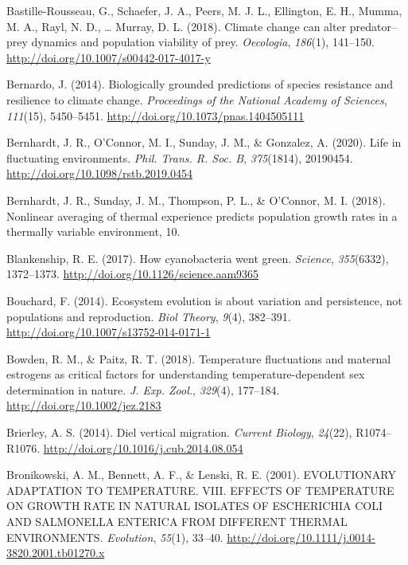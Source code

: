 \documentclass[12pt,twoside]{reedthesis}
\begin{document}
\leavevmode\hypertarget{ref-bastille-rousseau_climate_2018}{}%
Bastille-Rousseau, G., Schaefer, J. A., Peers, M. J. L., Ellington, E. H., Mumma, M. A., Rayl, N. D., \ldots{} Murray, D. L. (2018). Climate change can alter predator--prey dynamics and population viability of prey. \emph{Oecologia}, \emph{186}(1), 141--150. \url{http://doi.org/10.1007/s00442-017-4017-y}

\leavevmode\hypertarget{ref-bernardo_biologically_2014}{}%
Bernardo, J. (2014). Biologically grounded predictions of species resistance and resilience to climate change. \emph{Proceedings of the National Academy of Sciences}, \emph{111}(15), 5450--5451. \url{http://doi.org/10.1073/pnas.1404505111}

\leavevmode\hypertarget{ref-bernhardt_life_2020}{}%
Bernhardt, J. R., O'Connor, M. I., Sunday, J. M., \& Gonzalez, A. (2020). Life in fluctuating environments. \emph{Phil. Trans. R. Soc. B}, \emph{375}(1814), 20190454. \url{http://doi.org/10.1098/rstb.2019.0454}

\leavevmode\hypertarget{ref-bernhardt_nonlinear_2018}{}%
Bernhardt, J. R., Sunday, J. M., Thompson, P. L., \& O'Connor, M. I. (2018). Nonlinear averaging of thermal experience predicts population growth rates in a thermally variable environment, 10.

\leavevmode\hypertarget{ref-blankenship_how_2017}{}%
Blankenship, R. E. (2017). How cyanobacteria went green. \emph{Science}, \emph{355}(6332), 1372--1373. \url{http://doi.org/10.1126/science.aam9365}

\leavevmode\hypertarget{ref-bouchard_ecosystem_2014}{}%
Bouchard, F. (2014). Ecosystem evolution is about variation and persistence, not populations and reproduction. \emph{Biol Theory}, \emph{9}(4), 382--391. \url{http://doi.org/10.1007/s13752-014-0171-1}

\leavevmode\hypertarget{ref-bowden_temperature_2018}{}%
Bowden, R. M., \& Paitz, R. T. (2018). Temperature fluctuations and maternal estrogens as critical factors for understanding temperature-dependent sex determination in nature. \emph{J. Exp. Zool.}, \emph{329}(4), 177--184. \url{http://doi.org/10.1002/jez.2183}

\leavevmode\hypertarget{ref-brierley_diel_2014}{}%
Brierley, A. S. (2014). Diel vertical migration. \emph{Current Biology}, \emph{24}(22), R1074--R1076. \url{http://doi.org/10.1016/j.cub.2014.08.054}

\leavevmode\hypertarget{ref-bronikowski_evolutionary_2001}{}%
Bronikowski, A. M., Bennett, A. F., \& Lenski, R. E. (2001). EVOLUTIONARY ADAPTATION TO TEMPERATURE. VIII. EFFECTS OF TEMPERATURE ON GROWTH RATE IN NATURAL ISOLATES OF ESCHERICHIA COLI AND SALMONELLA ENTERICA FROM DIFFERENT THERMAL ENVIRONMENTS. \emph{Evolution}, \emph{55}(1), 33--40. \url{http://doi.org/10.1111/j.0014-3820.2001.tb01270.x}
\end{document}
